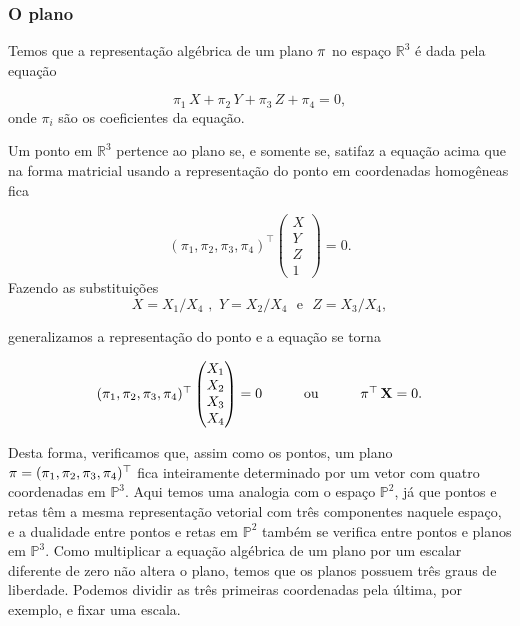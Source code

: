  

\subsubsection*{O plano}

Temos que a representação algébrica de um plano $\pi$ no espaço $\mathbb{R}^3$ é dada pela equação

\begin{equation*}
\pi_1\,X+\pi_2\,Y+\pi_3\,Z+\pi_4=0,
\end{equation*}
onde $\pi_i$ são os coeficientes da equação.

Um ponto em $\mathbb{R}^3$ pertence ao plano se, e somente se, satifaz a equação acima que na forma matricial usando a representação do ponto em coordenadas homogêneas fica

\begin{equation*}
  (\pi_1,\pi_2,\pi_3,\pi_4)^\top
 \begin{pmatrix}
  X\\
  Y\\
  Z\\
  1
  \end{pmatrix}
 = 0.
\end{equation*}
Fazendo as substituições 
\begin{equation*}
X=X_1/X_4 \,\, , \,\, Y=X_2/X_4 \,\,\,\, \text{e} \,\,\,\, Z=X_3/X_4 ,
\end{equation*}

generalizamos a representação do ponto e a equação se torna

\begin{equation*}
\begin{array}{ccc}
(\pi_1,\pi_2,\pi_3,\pi_4)^\top
  \begin{pmatrix}
  X_1\\
  X_2\\
  X_3\\
  X_4
  \end{pmatrix}
  = 0
& \qquad \text{ou} \qquad
& \pi^\top \, \mathbf{X} = 0.
\end{array}
\end{equation*}

Desta forma, verificamos que, assim como os pontos, um plano $\pi = (\pi_1,\pi_2,\pi_3,\pi_4)^\top$ fica inteiramente determinado por um vetor com quatro coordenadas em $\mathbb{P}^3$. Aqui temos uma analogia com o espaço $\mathbb{P}^2$, já que pontos e retas têm a mesma representação vetorial com três componentes naquele espaço, e a dualidade entre pontos e retas em $\mathbb{P}^2$ também se verifica entre pontos e planos em $\mathbb{P}^3$. Como multiplicar a equação algébrica de um plano por um escalar diferente de zero não altera o plano, temos que os planos possuem três graus de liberdade. Podemos dividir as três primeiras coordenadas pela última, por exemplo, e fixar uma escala.

